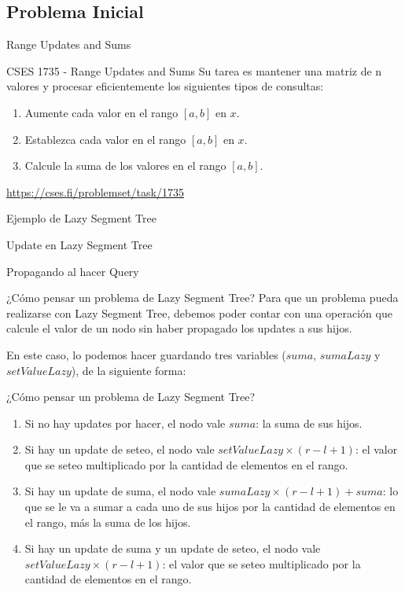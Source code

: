 \documentclass{beamer}
\begin{document}
\subsection{Problema Inicial}
\begin{frame}{Range Updates and Sums}
\begin{block}{CSES 1735 - Range Updates and Sums}
Su tarea es mantener una matriz de n valores y procesar eficientemente los siguientes tipos de consultas:
\begin{enumerate}
    \item Aumente cada valor en el rango $[a,b]$ en $x$.
    \item Establezca cada valor en el rango $[a,b]$ en $x$.
    \item Calcule la suma de los valores en el rango $[a,b]$.
\end{enumerate}
\end{block}

\url{https://cses.fi/problemset/task/1735}
\end{frame}

\begin{frame}{Ejemplo de Lazy Segment Tree}

\end{frame}

\begin{frame}{Update en Lazy Segment Tree}

\end{frame}

\begin{frame}{Propagando al hacer Query}

\end{frame}
    

\begin{frame}{¿Cómo pensar un problema de Lazy Segment Tree?}
Para que un problema pueda realizarse con Lazy Segment Tree, debemos poder contar con una operación que calcule el valor de un nodo sin haber propagado los updates a sus hijos.

En este caso, lo podemos hacer guardando tres variables ($suma$, $sumaLazy$ y $setValueLazy$), de la siguiente forma:
\end{frame}

\begin{frame}{¿Cómo pensar un problema de Lazy Segment Tree?}
\begin{enumerate}
    \item Si no hay updates por hacer, el nodo vale $suma$: la suma de sus hijos.
    \pause
    \item Si hay un update de seteo, el nodo vale $setValueLazy \times (r-l+1)$: el valor que se seteo multiplicado por la cantidad de elementos en el rango.
    \pause
    \item Si hay un update de suma, el nodo vale $sumaLazy \times (r-l+1) + suma$: lo que se le va a sumar a cada uno de sus hijos por la cantidad de elementos en el rango, más la suma de los hijos.
    \pause
    \item Si hay un update de suma y un update de seteo, el nodo vale $setValueLazy \times (r-l+1)$: el valor que se seteo multiplicado por la cantidad de elementos en el rango.
\end{enumerate}
\end{frame}
\end{document}
